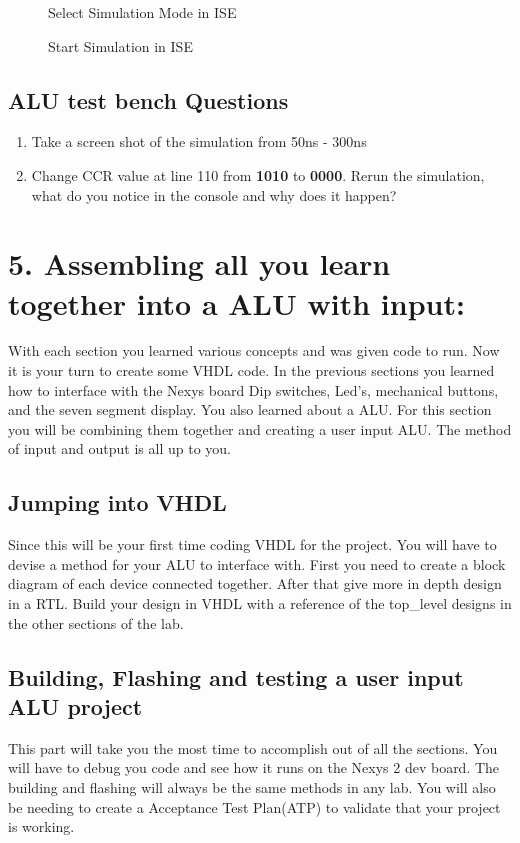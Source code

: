 \documentclass{article}
\begin{document}
\begin{figure}[!htb]
  \centering
  \caption{Select Simulation Mode in ISE}
\end{figure}

\begin{figure}[!htb]
  \centering
  \caption{Start Simulation in ISE}
\end{figure}

\newpage
\subsection{ALU test bench Questions}
\begin{enumerate}
  \item Take a screen shot of the simulation from 50ns - 300ns
  \item Change CCR value at line 110 from \textbf{1010} to \textbf{0000}. Rerun the simulation, what do you notice in the console and why does it happen?
\end{enumerate}

\newpage

\section{5. Assembling all you learn together into a ALU with input:}
With each section you learned various concepts and was given code to run. Now it is your turn to create some VHDL code. In the previous sections you learned how to interface with the Nexys board Dip switches, Led's, mechanical buttons, and the seven segment display. You also learned about a ALU. For this section you will be combining them together and creating a user input ALU. The method of input and output is all up to you.

\subsection{Jumping into VHDL}
Since this will be your first time coding VHDL for the project. You will have to devise a method for your ALU to interface with. First you need to create a block diagram of each device connected together. After that give more in depth design in a RTL. Build your design in VHDL with a reference of the top\_level designs in the other sections of the lab.

\subsection{Building, Flashing and testing a user input ALU project}
This part will take you the most time to accomplish out of all the sections. You will have to debug you code and see how it runs on the Nexys 2 dev board. The building and flashing will always be the same methods in any lab. You will also be needing to create a Acceptance Test Plan(ATP) to validate that your project is working.
\end{document}
